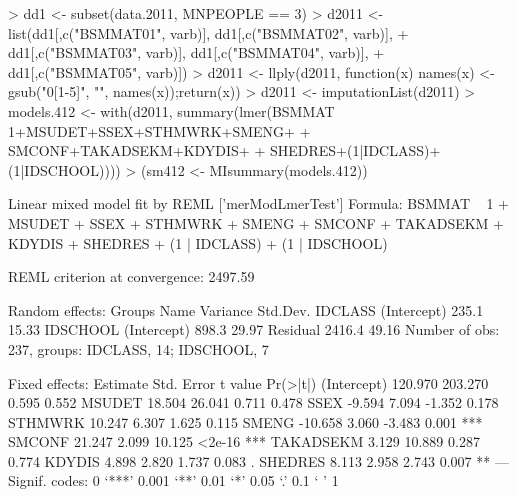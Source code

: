 \documentclass[a4paper]{article}
\begin{document}
\begin{Schunk}
\begin{Sinput}
> dd1 <- subset(data.2011, MNPEOPLE == 3)
> d2011 <- list(dd1[,c("BSMMAT01", varb)], dd1[,c("BSMMAT02", varb)], 
+               dd1[,c("BSMMAT03", varb)], dd1[,c("BSMMAT04", varb)],
+               dd1[,c("BSMMAT05", varb)])
> d2011 <- llply(d2011, function(x) {names(x) <- gsub("0[1-5]", "", names(x));return(x)})
> d2011 <- imputationList(d2011)
> models.412 <- with(d2011, summary(lmer(BSMMAT ~ 1+MSUDET+SSEX+STHMWRK+SMENG+
+                                          SMCONF+TAKADSEKM+KDYDIS+
+                                          SHEDRES+(1|IDCLASS)+(1|IDSCHOOL))))
> (sm412 <- MIsummary(models.412))
\end{Sinput}
\begin{Soutput}
Linear mixed model fit by REML ['merModLmerTest']
Formula: BSMMAT ~ 1 + MSUDET + SSEX + STHMWRK + SMENG + SMCONF + TAKADSEKM +      KDYDIS + SHEDRES + (1 | IDCLASS) + (1 | IDSCHOOL) 

REML criterion at convergence: 2497.59 

Random effects:
 Groups   Name        Variance Std.Dev.
 IDCLASS  (Intercept)  235.1   15.33   
 IDSCHOOL (Intercept)  898.3   29.97   
 Residual             2416.4   49.16   
Number of obs: 237, groups: IDCLASS, 14; IDSCHOOL, 7

Fixed effects:
            Estimate Std. Error t value Pr(>|t|)    
(Intercept)  120.970    203.270   0.595    0.552    
MSUDET        18.504     26.041   0.711    0.478    
SSEX          -9.594      7.094  -1.352    0.178    
STHMWRK       10.247      6.307   1.625    0.115    
SMENG        -10.658      3.060  -3.483    0.001 ***
SMCONF        21.247      2.099  10.125   <2e-16 ***
TAKADSEKM      3.129     10.889   0.287    0.774    
KDYDIS         4.898      2.820   1.737    0.083 .  
SHEDRES        8.113      2.958   2.743    0.007 ** 
---
Signif. codes:  0 ‘***’ 0.001 ‘**’ 0.01 ‘*’ 0.05 ‘.’ 0.1 ‘ ’ 1


\end{Soutput}
\end{Schunk}
\end{document}

